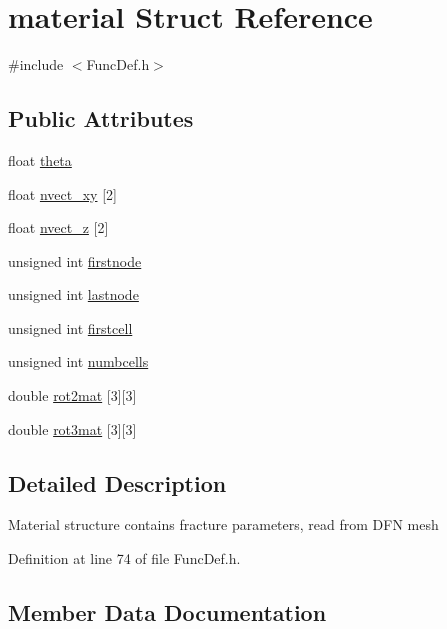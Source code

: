 \hypertarget{structmaterial}{}\section{material Struct Reference}
\label{structmaterial}


{\ttfamily \#include $<$Func\+Def.\+h$>$}

\subsection*{Public Attributes}
\begin{DoxyCompactItemize}
\item 
float \mbox{\hyperlink{structmaterial_add2db22d2a9dd5c1c2ec6f14038d43f6}{theta}}
\item 
float \mbox{\hyperlink{structmaterial_a64fad3469b934d7e29be84f2d9b7d7a3}{nvect\+\_\+xy}} \mbox{[}2\mbox{]}
\item 
float \mbox{\hyperlink{structmaterial_aa0a097a3f8fe23d9b3bd41d80cbfacfd}{nvect\+\_\+z}} \mbox{[}2\mbox{]}
\item 
unsigned int \mbox{\hyperlink{structmaterial_a82946cb78555ad8c4c14a12fbd7aa3f8}{firstnode}}
\item 
unsigned int \mbox{\hyperlink{structmaterial_a9bbfaca53483df79578f4ae037867851}{lastnode}}
\item 
unsigned int \mbox{\hyperlink{structmaterial_a528c4eed064175c3377dde7380d17ddc}{firstcell}}
\item 
unsigned int \mbox{\hyperlink{structmaterial_a84365556a52eb9959d6d869dda76433c}{numbcells}}
\item 
double \mbox{\hyperlink{structmaterial_a572b56f5488c560ee0fe118592b660a7}{rot2mat}} \mbox{[}3\mbox{]}\mbox{[}3\mbox{]}
\item 
double \mbox{\hyperlink{structmaterial_a8df25744238b2b814530d49ad58f484d}{rot3mat}} \mbox{[}3\mbox{]}\mbox{[}3\mbox{]}
\end{DoxyCompactItemize}


\subsection{Detailed Description}
Material structure contains fracture parameters, read from D\+FN mesh 

Definition at line 74 of file Func\+Def.\+h.



\subsection{Member Data Documentation}
\mbox{\label{structmaterial_a528c4eed064175c3377dde7380d17ddc}} 
